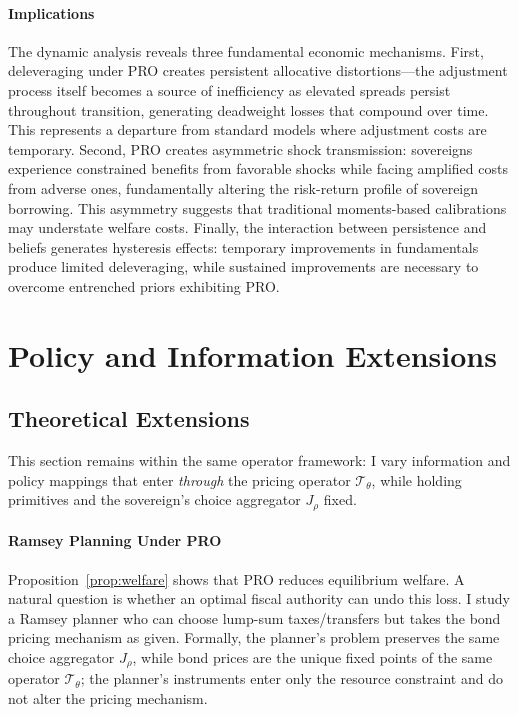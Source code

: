 \documentclass[12pt]{article}
\theoremstyle{plain}
\begin{document}
\paragraph{Implications}

The dynamic analysis reveals three fundamental economic mechanisms. First,
deleveraging under PRO creates persistent allocative distortions—the adjustment
process itself becomes a source of inefficiency as elevated spreads persist
throughout transition, generating deadweight losses that compound over time.
This represents a departure from standard models where adjustment costs are
temporary. Second, PRO creates asymmetric shock transmission: sovereigns
experience constrained benefits from favorable shocks while facing amplified
costs from adverse ones, fundamentally altering the risk-return profile of
sovereign borrowing. This asymmetry suggests that traditional moments-based
calibrations may understate welfare costs. Finally, the interaction between
persistence and beliefs generates hysteresis effects: temporary improvements in
fundamentals produce limited deleveraging, while sustained improvements are
necessary to overcome entrenched priors exhibiting PRO.

\section{Policy and Information Extensions}

\subsection{Theoretical Extensions}\label{sec:extensions}
This section remains within the same operator framework: I vary information
and policy mappings that enter \emph{through} the pricing operator $\mathcal
	T_\theta$, while holding primitives and the sovereign's choice aggregator
$J_\rho$ fixed.

\paragraph{Ramsey Planning Under PRO}\label{sec:ramsey}
Proposition~\ref{prop:welfare} shows that PRO reduces equilibrium welfare. A
natural question is whether an optimal fiscal authority can undo this loss. I
study a Ramsey planner who can choose lump-sum taxes/transfers but takes the
bond pricing mechanism as given. Formally, the planner's problem preserves the
same choice aggregator $J_\rho$, while bond prices are the unique fixed points
of the same operator $\mathcal T_\theta$; the planner's instruments enter only
the resource constraint and do not alter the pricing mechanism.
\end{document}
